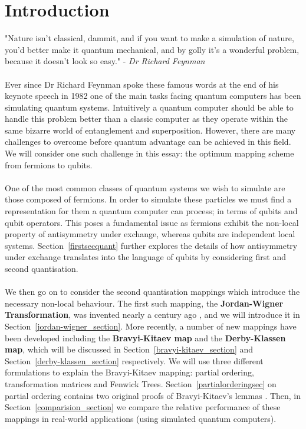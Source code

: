 \documentclass[twoside]{article}
\begin{document}
\section{Introduction}
"Nature isn't classical, dammit, and if you want to make a simulation of nature, you'd better make it quantum mechanical, and by golly it's a wonderful problem, because it doesn't look so easy." - \textsl{Dr Richard Feynman} \cite{feynmann}  \\\\
Ever since Dr Richard Feynman spoke these famous words at the end of his keynote speech in 1982 one of the main tasks facing quantum computers has been simulating quantum systems. Intuitively a quantum computer should be able to handle this problem better than a classic computer as they operate within the same bizarre world of entanglement and superposition. However, there are many challenges to overcome before quantum advantage can be achieved in this field. We will consider one such challenge in this essay: the optimum mapping scheme from fermions to qubits.\\\\
One of the most common classes of quantum systems we wish to simulate are those composed of fermions. In order to simulate these particles we must find a representation for them a quantum computer can process; in terms of qubits and qubit operators. This poses a fundamental issue as fermions exhibit the non-local property of antisymmetry under exchange, whereas qubits are independent local systems. Section~\ref{firstsecquant} further explores the details of how antisymmetry under exchange translates into the language of qubits by considering first and second quantisation. \\\\
We then go on to consider the second quantisation mappings which introduce the necessary non-local behaviour. The first such mapping, the \textbf{Jordan-Wigner Transformation}, was invented nearly a century ago \cite{originalJordanWigner}, and we will introduce it in Section~\ref{jordan-wigner_section}. More recently, a number of new mappings have been developed including the \textbf{Bravyi-Kitaev map} and the \textbf{Derby-Klassen map}, which will be discussed in Section~\ref{bravyi-kitaev_section} and Section~\ref{derby-klassen_section} respectively. We will use three different formulations to explain the Bravyi-Kitaev mapping: partial ordering, transformation matrices and Fenwick Trees. Section~\ref{partialorderingsec} on partial ordering contains two original proofs of Bravyi-Kitaev's lemmas \cite{bravyikitaev}. Then, in Section~\ref{comparision_section} we compare the relative performance of these mappings in real-world applications (using simulated quantum computers).
\end{document}
